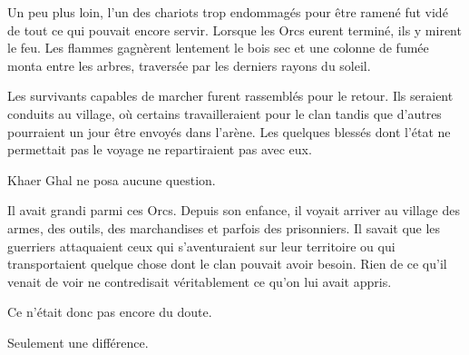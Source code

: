 Un peu plus loin, l'un des chariots trop endommagés pour être ramené fut vidé
de tout ce qui pouvait encore servir. Lorsque les Orcs eurent terminé, ils y
mirent le feu. Les flammes gagnèrent lentement le bois sec et une colonne de
fumée monta entre les arbres, traversée par les derniers rayons du soleil.

Les survivants capables de marcher furent rassemblés pour le retour. Ils
seraient conduits au village, où certains travailleraient pour le clan tandis
que d'autres pourraient un jour être envoyés dans l'arène. Les quelques
blessés dont l'état ne permettait pas le voyage ne repartiraient pas avec eux.

Khaer Ghal ne posa aucune question.

Il avait grandi parmi ces Orcs. Depuis son enfance, il voyait arriver au village
des armes, des outils, des marchandises et parfois des prisonniers. Il savait
que les guerriers attaquaient ceux qui s'aventuraient sur leur territoire ou
qui transportaient quelque chose dont le clan pouvait avoir besoin. Rien de ce
qu'il venait de voir ne contredisait véritablement ce qu'on lui avait appris.

Ce n'était donc pas encore du doute.

Seulement une différence.